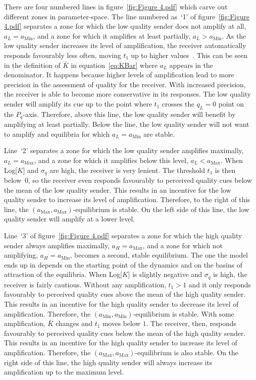 \documentclass[a4paper,12pt]{article}
\numberwithin{equation}{section}
\numberwithin{figure}{section}
\begin{document}
There are four numbered lines in figure~\ref{fig:Figure 4.pdf} which carve out different zones in parameter-space. The line numbered as~`1' of figure~\ref{fig:Figure 4.pdf} separates a zone for which the low quality sender does not amplify at all, $a_{L}=a_{\text{Min}}$, and a zone for which it amplifies at least partially, $a_{L}>a_{\text{Min}}$. As the low quality sender increases its level of amplification, the receiver automatically responds favourably less often, moving $t_{1}$ up to higher values~\cite{Gualla2008}. This can be seen in the definition of $\bar{K}$ in equation~\ref{eq:KBar} where $a_{L}$ appears in the denominator. It happens because higher levels of amplification lead to more precision in the assessment of quality for the receiver. With increased precision, the receiver is able to become more conservative in its responses. The low quality sender will amplify its cue up to the point where $t_{1}$ crosses the $q_L = 0$ point on the $P_{q}$-axis. Therefore, above this line, the low quality sender will benefit by amplifying at least partially. Below the line, the low quality sender will not want to amplify and equilibria for which $a_{L}=a_{\text{Min}}$ are stable.

Line~`2' separates a zone for which the low quality sender amplifies maximally, $a_{L}=a_{\text{Max}}$, and a zone for which it amplifies below this level, $a_{L}<a_{\text{Max}}$. When Log[$K$] and $\sigma_{q}$ are high, the receiver is very lenient. The threshold $t_{1}$ is then below~$0$, so the receiver even responds favourably to perceived quality cues below the mean of the low quality sender. This results in an incentive for the low quality sender to increase its level of amplification. Therefore, to the right of this line, the $(a_{\text{Max}},a_{\text{Max}})$-equilibrium is stable. On the left side of this line, the low quality sender will amplify at a lower level.

Line~`3' of figure~\ref{fig:Figure 4.pdf} separates a zone for which the high quality sender always amplifies maximally, $a_{H}=a_{\text{Max}}$, and a zone for which not amplifying, $a_{H}=a_{\text{Min}}$, becomes a second, stable equilibrium. The one the model ends up in depends on the starting point of the dynamics and on the basins of attraction of the equilibria. When Log[$K$] is slightly negative and $\sigma_{q}$ is high, the receiver is fairly cautious. Without any amplification, $t_{1}>1$ and it only responds favourably to perceived quality cues above the mean of the high quality sender. This results in an incentive for the high quality sender to decrease its level of amplification. Therefore, the $(a_{\text{Min}},a_{\text{Min}})$-equilibrium is stable. With some amplification, $\bar{K}$ changes and $t_{1}$ moves below $1$. The receiver, then, responds favourably to perceived quality cues below the mean of the high quality sender. This results in an incentive for the high quality sender to increase its level of amplification. Therefore, the $(a_{\text{Max}},a_{\text{Max}})$-equilibrium is also stable. On the right side of this line, the high quality sender will always increase its amplification up to the maximum level.
 
\end{document}

